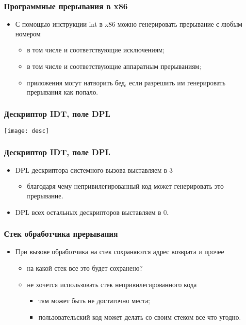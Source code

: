 \begin{frame}
\frametitle{Программные прерывания в x86}
\begin{itemize}
    \item<1->С помощью инструкции int в x86 можно генерировать прерывание с
        любым номером
    \begin{itemize}
        \item<2->в том числе и соответствующие исключениям;
        \item<3->в том числе и соответствующие аппаратным прерываниям;
        \item<4->приложения могут натворить бед, если разрешить им
             генерировать прерывания как попало.
    \end{itemize}
\end{itemize}
\end{frame}

\begin{frame}
\frametitle{Дескриптор IDT, поле DPL}
\texttt{[image: desc]}
\end{frame}

\begin{frame}
\frametitle{Дескриптор IDT, поле DPL}
\begin{itemize}
    \item<1->DPL дескриптора системного вызова выставляем в 3
    \begin{itemize}
        \item<2->благодаря чему непривилегированный код может генерировать
             это прерывание.
    \end{itemize}
    \item<2->DPL всех остальных дескрипторов выставляем в 0.
\end{itemize}
\end{frame}

\begin{frame}
\frametitle{Стек обработчика прерывания}
\begin{itemize}
    \item<1->При вызове обработчика на стек сохраняются адрес возврата и прочее
    \begin{itemize}
        \item<2->на какой стек все это будет сохранено?
        \item<3->не хочется использовать стек непривилегированного кода
        \begin{itemize}
            \item<4->там может быть не достаточно места;
            \item<5->пользовательский код может делать со своим стеком все
                 что угодно.
        \end{itemize}
    \end{itemize}
\end{itemize}
\end{frame}

